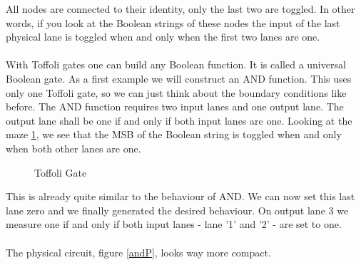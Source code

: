 \documentclass[oneside]{thesisclass}
\begin{document}
All nodes are connected to their identity, only the last two are toggled.
In other words, if you look at the Boolean strings of these nodes the input of the last physical lane is toggled when and only when the first two lanes are one.\\
\\With Toffoli gates one can build any Boolean function. 
It is called a universal Boolean gate.
As a first example we will construct an AND function.
This uses only one Toffoli gate, so we can just think about the boundary conditions like before.
The AND function requires two input lanes and one output lane.
The output lane shall be one if and only if both input lanes are one.
Looking at the maze \ref{tofAnd}, we see that the MSB of the Boolean string is toggled when and only when both other lanes are one.
\begin{figure}
 \begin{center}
  \caption{Toffoli Gate}
  \label{tofAnd}
 \end{center}
\end{figure}
This is already quite similar to the behaviour of AND.
We can now set this last lane zero and we finally generated the desired behaviour.
On output lane 3 we measure one if and only if both input lanes - lane '1' and '2' - are set to one.\\
\\The physical circuit, figure \ref{andP}, looks way more compact.
\end{document}
